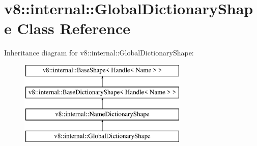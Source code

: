 \hypertarget{classv8_1_1internal_1_1_global_dictionary_shape}{}\section{v8\+:\+:internal\+:\+:Global\+Dictionary\+Shape Class Reference}
\label{classv8_1_1internal_1_1_global_dictionary_shape}
Inheritance diagram for v8\+:\+:internal\+:\+:Global\+Dictionary\+Shape\+:\begin{figure}[H]
\begin{center}
\leavevmode
\includegraphics[height=4.000000cm]{classv8_1_1internal_1_1_global_dictionary_shape}
\end{center}
\end{figure}
